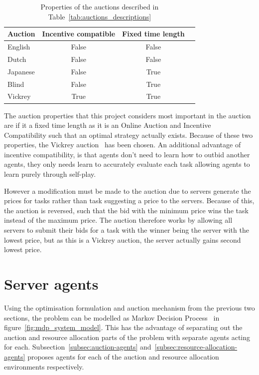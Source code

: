 \begin{table}[h]
    \centering
    \begin{tabular}{|l|c|c|c|} \hline
        \textbf{Auction}  & \textbf{Incentive compatible} & \textbf{Fixed time length} \\ \hline
        English           & False                         & False            \\ \hline
        Dutch             & False                         & False            \\ \hline
        Japanese          & False                         & True             \\ \hline
        Blind             & False                         & True             \\ \hline
        Vickrey           & True                          & True             \\ \hline
    \end{tabular}
    \caption{Properties of the auctions described in Table~\ref{tab:auctions_descriptions}}
    \label{tab:auction_properties}
\end{table}

The auction properties that this project considers most important in the auction are if it a fixed time length as it is
an Online Auction and Incentive Compatibility such that an optimal strategy actually exists. Because of these two
properties, the Vickrey auction~\citep{vickrey} has been chosen. An additional advantage of incentive compatibility,
is that agents don't need to learn how to outbid another agents, they only needs learn to accurately evaluate each
task allowing agents to learn purely through self-play.

However a modification must be made to the auction due to servers generate the prices for tasks rather than task
suggesting a price to the servers. Because of this, the auction is reversed, such that the bid with the minimum price
wins the task instead of the maximum price. The auction therefore works by allowing all servers to submit their bids for
a task with the winner being the server with the lowest price, but as this is a Vickrey auction, the server actually
gains second lowest price.

\section{Server agents}
\label{sec:server-agents}
Using the optimisation formulation and auction mechanism from the previous two sections, the problem can be modelled as
Markov Decision Process~\citep{Bel} in figure~\ref{fig:mdp_system_model}. This has the advantage of separating out the
auction and resource allocation parts of the problem with separate agents acting for each.
Subsection~\ref{subsec:auction-agents} and~\ref{subsec:resource-allocation-agents} proposes agents
for each of the auction and resource allocation environments respectively.


